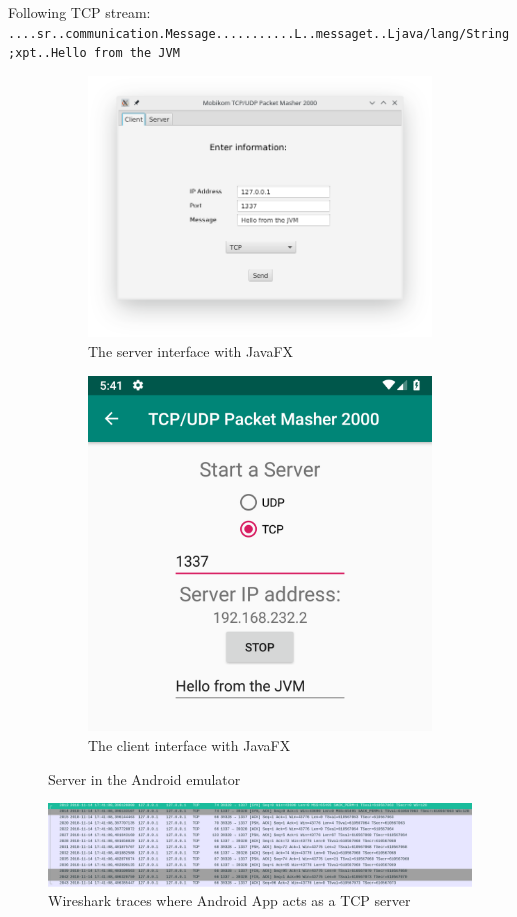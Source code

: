 Following TCP stream:\\
\texttt{....sr..communication.Message...........L..messaget..Ljava/lang/String;xpt..Hello from the JVM}



\begin{figure}[H]
	\centering
	\begin{subfigure}{.49\textwidth}
		\centering
		\includegraphics[width=1\linewidth]{images/task3/desktopTCP.png}
		\caption{The server interface with JavaFX}
		\label{fig:desktopTCP}
	\end{subfigure}
\begin{subfigure}{.49\textwidth}
	\centering
	\includegraphics[width=0.74\linewidth]{images/task3/AndroidTCP.png}
	\caption{The client interface with JavaFX}
	\label{fig:androidTCP}
\end{subfigure}%
	\caption{Server in the Android emulator}
	\label{fig:emulator}
\end{figure}


\begin{figure}[H]
	\includegraphics[width=1\linewidth]{images/task3/wiresharkAndroidEmuServer.png}
	\caption{Wireshark traces where Android App acts as a TCP server}
	\label{fig:wire1}
\end{figure}